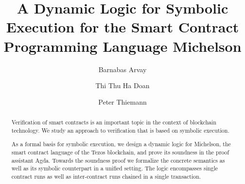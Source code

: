 \documentclass[a4paper,USenglish,cleveref,autoref]{lipics-v2021}
\title{A Dynamic Logic for Symbolic Execution for the Smart Contract Programming Language Michelson}
\author{Barnabas Arvay}{University of Freiburg, Germany}{barnabasarvay@gmail.com}{https://orcid.org/0009-0002-2720-7100}{}%
\author{Thi Thu Ha Doan}{University of Freiburg,
  Germany}{doanha@informatik.uni-freiburg.de}{https://orcid.org/0000−0001−7524−4497}{Supported
  by the Tezos Foundation, grant COOC}
\author{Peter Thiemann}{University of Freiburg, Germany}{thiemann@informatik.uni-freiburg.de}{https://orcid.org/0000−0002−9000−1239}{}
\begin{document}
\maketitle

\begin{abstract}
Verification of smart contracts is an important topic in the context
of blockchain technology. We study an approach to verification that is
based on symbolic execution. 

As a formal basis for symbolic execution, we design a dynamic logic
for Michelson, the smart contract language of the Tezos blockchain,
and prove its soundness in the proof assistant Agda. Towards the
soundness proof we formalize the concrete semantics as well as its
symbolic counterpart in a unified setting. The logic encompasses
single contract runs as well as inter-contract runs chained in a single transaction. 
\end{abstract}









\end{document}
